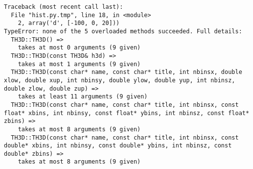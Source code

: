 \begin{footnotesize}
\begin{verbatim}
Traceback (most recent call last):
  File "hist.py.tmp", line 18, in <module>
    2, array('d', [-100, 0, 20]))
TypeError: none of the 5 overloaded methods succeeded. Full details:
  TH3D::TH3D() =>
    takes at most 0 arguments (9 given)
  TH3D::TH3D(const TH3D& h3d) =>
    takes at most 1 arguments (9 given)
  TH3D::TH3D(const char* name, const char* title, int nbinsx, double xlow, double xup, int nbinsy, double ylow, double yup, int nbinsz, double zlow, double zup) =>
    takes at least 11 arguments (9 given)
  TH3D::TH3D(const char* name, const char* title, int nbinsx, const float* xbins, int nbinsy, const float* ybins, int nbinsz, const float* zbins) =>
    takes at most 8 arguments (9 given)
  TH3D::TH3D(const char* name, const char* title, int nbinsx, const double* xbins, int nbinsy, const double* ybins, int nbinsz, const double* zbins) =>
    takes at most 8 arguments (9 given)
\end{verbatim}
\end{footnotesize}
